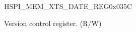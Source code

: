 \begin{register}{H}{SPI\_MEM\_XTS\_DATE\_REG}{0x035C}\label{regdesc:SPIMEMXTSDATEREG}
%
%
\regnewline%
\begin{regdesc}\begin{reglist}
\label{fielddesc:SPIMEMXTSDATE}\item [SPI\_MEM\_XTS\_DATE] Version control register. (R/W)
\end{reglist}\end{regdesc}
\end{register}
